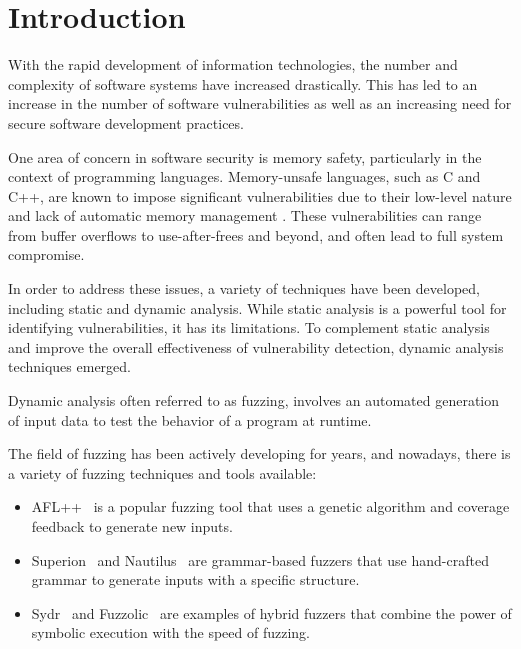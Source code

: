 \documentclass[conference]{IEEEtran}
\begin{document}
\IEEEpeerreviewmaketitle



\section{Introduction}
With the rapid development of information technologies, the number and complexity of software systems have increased drastically. This has led to an increase in the number of software vulnerabilities as well as an increasing need for secure software development practices.

One area of concern in software security is memory safety, particularly in the context of programming languages. Memory-unsafe languages, such as C and C++, are known to impose significant vulnerabilities due to their low-level nature and lack of automatic memory management \cite{chromium-project-memory-safety, android-project-memory-safety}. These vulnerabilities can range from buffer overflows to use-after-frees and beyond, and often lead to full system compromise.

In order to address these issues, a variety of techniques have been developed, including static and dynamic analysis. While static analysis is a powerful tool for identifying vulnerabilities, it has its limitations. To complement static analysis and improve the overall effectiveness of vulnerability detection, dynamic analysis techniques emerged.

Dynamic analysis often referred to as fuzzing, involves an automated generation of input data to test the behavior of a program at runtime.

The field of fuzzing has been actively developing for years, and nowadays, there is a variety of fuzzing techniques and tools available:

\begin{itemize}
    \item AFL++~\cite{AFLplusplus-Woot20} is a popular fuzzing tool that uses a genetic algorithm and coverage feedback to generate new inputs.
    \item Superion~\cite{superion-grammar-fuzzer} and Nautilus~\cite{nautilus-grammar-fuzzer} are grammar-based fuzzers that use hand-crafted grammar to generate inputs with a specific structure.
    \item Sydr~\cite{sydr-cutting-edge-dynamic-symbolic-execution} and Fuzzolic~\cite{fuzzolic-hybrid-fuzzer} are examples of hybrid fuzzers that combine the power of symbolic execution with the speed of fuzzing.
\end{itemize}
\end{document}
